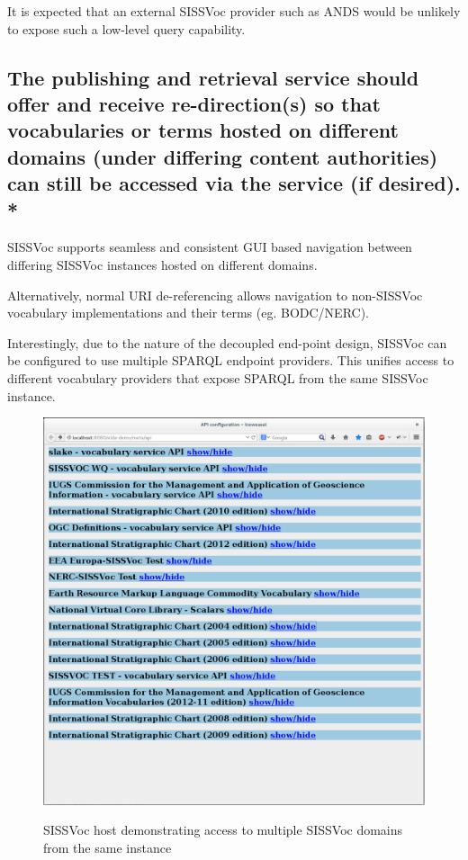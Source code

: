 \documentclass[10pt,a4paper]{article}
\begin{document}
\begin{flushleft}
  \item It is expected that an external SISSVoc provider such as ANDS would be 
  unlikely to expose such a low-level query capability.
   

\subsection{ The publishing and retrieval service should offer and receive
re-direction(s) so that vocabularies or terms hosted on different domains (under
differing content authorities) can still be accessed via the service (if
desired). * }

  {
  \item SISSVoc supports seamless and consistent GUI based navigation between differing
  SISSVoc instances hosted on different domains.
  \item Alternatively, normal URI de-referencing allows navigation to non-SISSVoc
  vocabulary implementations and their terms (eg. BODC/NERC).
  \item Interestingly, due to the nature of the decoupled end-point design, SISSVoc 
  can be configured to use multiple SPARQL endpoint providers. This unifies access
  to different vocabulary providers that expose SPARQL from the same SISSVoc instance. 

  \begin{figure}[H]
  \centering
  \caption{SISSVoc host demonstrating access to multiple SISSVoc domains from the same instance}
  \includegraphics[width=12cm]{multipleendpoints}  
  \label{fig:test}
  \end{figure}

}
\end{flushleft}
\end{document}
